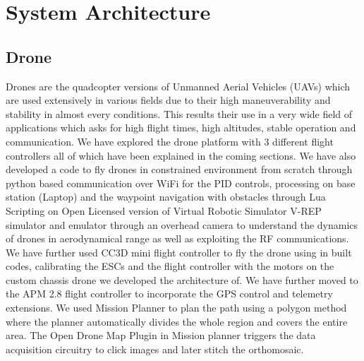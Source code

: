 
\chapter{System Architecture}

\section{Drone}
Drones are the quadcopter versions of Unmanned Aerial Vehicles (UAVs) which are used extensively in various fields due to their high maneuverability and stability in almost every conditions. This results their use in a very wide field of applications which asks for high flight times, high altitudes, stable operation and communication. We have explored the drone platform with 3 different flight controllers all of which have been explained in the coming sections. We have also developed a code to fly drones in constrained environment from scratch through python based communication over WiFi for the PID controls, processing on base station (Laptop) and the waypoint navigation with obstacles through Lua Scripting on Open Licensed version of Virtual Robotic Simulator V-REP simulator and emulator through an overhead camera to understand the dynamics of drones in aerodynamical range as well as exploiting the RF communications. We have further used CC3D mini flight controller to fly the drone using in built codes, calibrating the ESCs and the flight controller with the motors on the custom chassis drone we developed the architecture of. We have further moved to the APM 2.8 flight controller to incorporate the GPS control and telemetry extensions. We used Mission Planner to plan the path using a polygon method where the planner automatically divides the whole region and covers the entire area. The Open Drone Map Plugin in Mission planner triggers the data acquisition circuitry to click images and later stitch the orthomosaic. 

